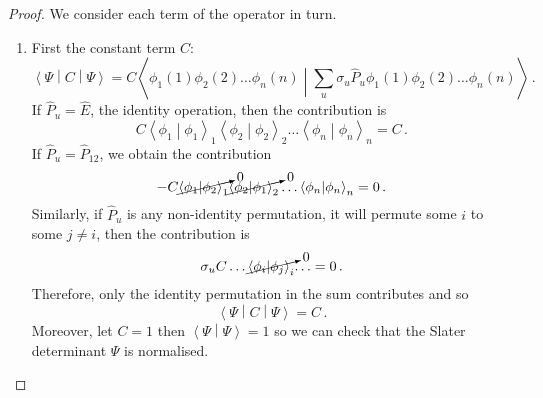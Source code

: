 \documentclass{article}
\theoremstyle{plain}\theoremheaderfont{\normalfont\itshape}\theorembodyfont{\rmfamily}\theoremseparator{.}\newtheorem*{rem}{Remark}\newtheorem*{ex}{Example}\newtheorem*{proof}{Proof}\newtheorem*{altp}{Alternative proof}
\theoremstyle{plain}\theoremheaderfont{\normalfont\bfseries}\theorembodyfont{\rmfamily}\theoremseparator{.}\newtheorem{thm}{Theorem}[section]\newtheorem{lem}[thm]{Lemma}\newtheorem{prop}[thm]{Proposition}\newtheorem*{cor}{Corollary}\newtheorem{defn}[thm]{Definition}\newtheorem{clm}[thm]{Claim}\newtheorem{clminproof}{Claim}
\theoremstyle{break}\theoremheaderfont{\normalfont\itshape}\theorembodyfont{\rmfamily}\theoremseparator{.\medskip}\newtheorem*{proofskip}{Proof}\newtheorem*{exs}{Examples}\newtheorem*{rems}{Remarks}
\theoremstyle{break}\theoremheaderfont{\normalfont\bfseries}\theorembodyfont{\rmfamily}\theoremseparator{.\medskip}\newtheorem{lemskip}[thm]{Lemma}\newtheorem{defnskip}[thm]{Definition}\newtheorem{propskip}[thm]{Proposition}\newtheorem{thmskip}[thm]{Theorem}
\numberwithin{equation}{section}
\newcommand{\braket}[2]{\left\langle #1 \middle| #2 \right\rangle}
\newcommand{\expval}[2]{\left\langle #2 \middle| #1 \middle| #2 \right\rangle}
\begin{document}
    \begin{proof}
        We consider each term of the operator in turn.
        \begin{enumerate}[topsep=0pt,label=(\roman*)]
            \item First the constant term \(C\):
            \begin{equation}
                \expval{C}{\Psi}=C\braket{\phi_1(1)\phi_2(2)\dots\phi_n(n)}{\sum_{u}\sigma_u\hat{P}_u\phi_1(1)\phi_2(2)\dots\phi_n(n)}\,.
            \end{equation}
            If \(\hat{P}_u=\hat{E}\), the identity operation, then the contribution is
            \begin{equation}
                C\braket{\phi_1}{\phi_1}_1\braket{\phi_2}{\phi_2}_2\dots\braket{\phi_n}{\phi_n}_n=C\,.
            \end{equation}
            If \(\hat{P}_u=\hat{P}_{12}\), we obtain the contribution
            \begin{equation}
                -C\cancelto{0}{\braket{\phi_1}{\phi_2}_1}\cancelto{0}{\braket{\phi_2}{\phi_1}_2}\dots\braket{\phi_n}{\phi_n}_n=0\,.
            \end{equation}
            Similarly, if \(\hat{P}_u\) is any non-identity permutation, it will permute some \(i\) to some \(j\ne i\), then the contribution is
            \begin{equation}
                \sigma_u C\dots\cancelto{0}{\braket{\phi_i}{\phi_j}_i}{\dots}=0\,.
            \end{equation}
            Therefore, only the identity permutation in the sum contributes and so
            \begin{equation}
                \expval{C}{\Psi}=C\,.
            \end{equation}
            Moreover, let \(C=1\) then \(\braket{\Psi}{\Psi}=1\) so we can check that the Slater determinant \(\Psi\) is normalised.


\end{enumerate}
\end{proof}
\end{document}
